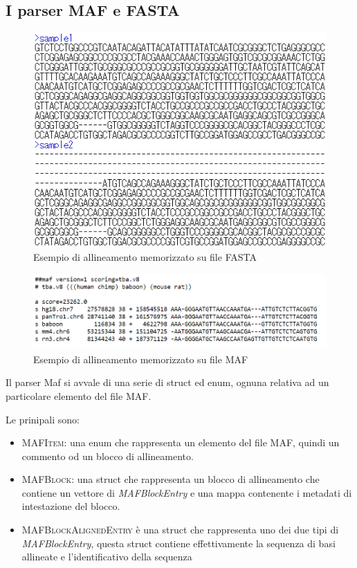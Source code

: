 \subsection{I parser MAF e FASTA}

\begin{figure}[ht]
    \centering
    \includegraphics[scale=0.5]{images/fasta example.png}
    \caption{Esempio di allineamento memorizzato su file FASTA}
    \label{fig:fasta_alignment}
\end{figure}

\begin{figure}[ht]
    \centering
    \includegraphics[scale=0.7]{images/Maf file example.PNG}
    \caption{Esempio di allineamento memorizzato su file MAF}
    \label{fig:maf_alignment}
\end{figure}

Il parser Maf si avvale di una serie di struct ed enum, ognuna relativa ad un particolare elemento del file MAF. 

Le prinipali sono:

\begin{itemize}
    \item \textsc{MAFItem}: una enum che rappresenta un elemento del file MAF, quindi un commento od un blocco di allineamento.
    
    \item \textsc{MAFBlock}: una struct che rappresenta un blocco di allineamento che contiene un vettore di \textit{MAFBlockEntry} e una mappa contenente i metadati di intestazione del blocco.
    
    \item \textsc{MAFBlockAlignedEntry} è una struct che rappresenta uno dei due tipi di \textit{MAFBlockEntry}, questa struct contiene effettivamente la sequenza di basi allineate e l'identificativo della sequenza
\end{itemize}

